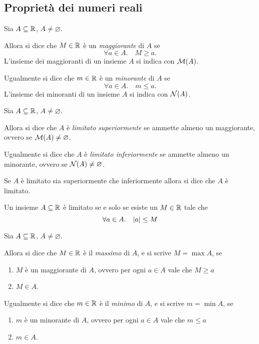 \subsection{Proprietà dei numeri reali}

\begin{definition} 
    Sia $A \subseteq \mathbb{R}$, $A \neq \varnothing$. 
    
    Allora si dice che $M \in \mathbb{R}$ è un \emph{maggiorante} di $A$ se \[
        \forall a \in A. \quad M \geq a. 
    \] L'insieme dei maggioranti di un insieme $A$ si indica con $\mathcal{M}(A)$.

    Ugualmente si dice che $m \in \mathbb{R}$ è un \emph{minorante} di $A$ se \[
        \forall a \in A. \quad m \leq a. 
    \] L'insieme dei minoranti di un insieme $A$ si indica con $\mathcal{N}(A)$.
\end{definition}

\begin{definition} 
    Sia $A \subseteq \mathbb{R}$, $A \neq \varnothing$. 
    
    Allora si dice che $A$ è \emph{limitato superiormente} se ammette almeno un maggiorante, ovvero se $\mathcal{M}(A) \neq \varnothing$.

    Ugualmente si dice che $A$ è \emph{limitato inferiormente} se ammette almeno un minorante, ovvero se $\mathcal{N}(A) \neq \varnothing$.

    Se $A$ è limitato sia superiormente che inferiormente allora si dice che $A$ è limitato.
\end{definition}

\begin{remark}
    Un insieme $A \subseteq \mathbb{R}$ è limitato se e solo se esiste un $M \in \mathbb{R}$ tale che \[
        \forall a \in A. \quad \abs*{a} \leq M    
    \]
\end{remark}

\begin{definition} 
    Sia $A \subseteq \mathbb{R}$, $A \neq \varnothing$. 

    Allora si dice che $M \in \mathbb{R}$ è il \emph{massimo} di $A$, e si scrive $M = \max A$, se
    \begin{enumerate}[label={(\roman*)}]
        \item $M$ è un maggiorante di $A$, ovvero per ogni $a \in A$ vale che $M \geq a$
        \item $M \in A$.
    \end{enumerate}
    
    Ugualmente si dice che $m \in \mathbb{R}$ è il \emph{minimo} di $A$, e si scrive $m = \min A$, se
    \begin{enumerate}[label={(\roman*)}]
        \item $m$ è un minorante di $A$, ovvero per ogni $a \in A$ vale che $m \leq a$
        \item $m \in A$.
    \end{enumerate}
\end{definition}

